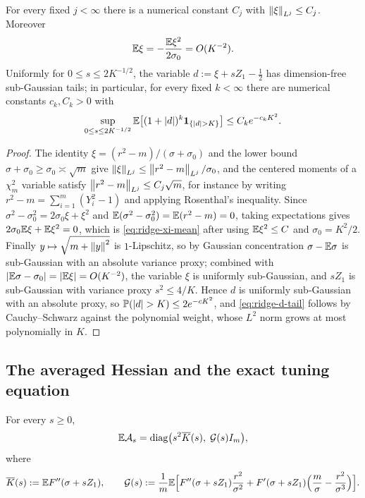 \begin{lemma}
\label{lem:ridge-xi}
For every fixed $j<\infty$ there is a numerical constant $C_j$ with
$\left\lVert \xi\right\rVert_{L^j}\leq C_j$. Moreover
\begin{equation}
\label{eq:ridge-xi-mean}
    \mathbb{E}\xi=-\frac{\mathbb{E}\xi^2}{2\sigma_0}=O(K^{-2}).
\end{equation}
Uniformly for $0\leq s\leq2K^{-1/2}$, the variable $d:=\xi+sZ_1-\tfrac12$ has dimension-free
sub-Gaussian tails; in particular, for every fixed $k<\infty$ there are numerical constants
$c_k,C_k>0$ with
\begin{equation}
\label{eq:ridge-d-tail}
    \sup_{0\leq s\leq2K^{-1/2}}
    \mathbb{E}\bigl[(1+\left\lvert d\right\rvert)^k\mathbf 1_{\{\left\lvert d\right\rvert>K\}}\bigr]\leq C_ke^{-c_kK^2}.
\end{equation}
\end{lemma}

\begin{proof}
The identity $\xi=(r^2-m)/(\sigma+\sigma_0)$ and the lower bound
$\sigma+\sigma_0\geq\sigma_0\asymp\sqrt m$ give
$\left\lVert \xi\right\rVert_{L^j}\leq\left\lVert r^2-m\right\rVert_{L^j}/\sigma_0$, and the centered moments of a $\chi_m^2$
variable satisfy $\left\lVert r^2-m\right\rVert_{L^j}\leq C_j\sqrt m$, for instance by writing
$r^2-m=\sum_{i=1}^m(Y_i^2-1)$ and applying Rosenthal's inequality. Since
$\sigma^2-\sigma_0^2=2\sigma_0\xi+\xi^2$ and $\mathbb{E}(\sigma^2-\sigma_0^2)=\mathbb{E}(r^2-m)=0$, taking
expectations gives $2\sigma_0\mathbb{E}\xi+\mathbb{E}\xi^2=0$, which is \eqref{eq:ridge-xi-mean} after using
$\mathbb{E}\xi^2\leq C$ and $\sigma_0=K^2/2$. Finally $y\mapsto\sqrt{m+\left\lVert y\right\rVert^2}$ is $1$-Lipschitz, so
by Gaussian concentration $\sigma-\mathbb{E}\sigma$ is sub-Gaussian with an absolute variance proxy;
combined with $\left\lvert \mathbb{E}\sigma-\sigma_0\right\rvert=\left\lvert \mathbb{E}\xi\right\rvert=O(K^{-2})$, the variable $\xi$ is uniformly
sub-Gaussian, and $sZ_1$ is sub-Gaussian with variance proxy $s^2\leq4/K$. Hence $d$ is
uniformly sub-Gaussian with an absolute proxy, so $\mathbb{P}(\left\lvert d\right\rvert>K)\leq2e^{-cK^2}$, and
\eqref{eq:ridge-d-tail} follows by Cauchy--Schwarz against the polynomial weight, whose $L^2$
norm grows at most polynomially in $K$.
\end{proof}

\subsection{The averaged Hessian and the exact tuning equation}

\begin{lemma}
\label{lem:ridge-mean-As}
For every $s\geq0$,
\begin{equation}
\label{eq:ridge-mean-As}
    \mathbb{E}\mathcal A_s=\operatorname{diag}\bigl(s^2\overline K(s),\;\mathcal G(s)I_m\bigr),
\end{equation}
where
\[
    \overline K(s):=\mathbb{E} F''(\sigma+sZ_1),
    \qquad
    \mathcal G(s):=\frac1m\mathbb{E}\Bigl[F''(\sigma+sZ_1)\frac{r^2}{\sigma^2}
    +F'(\sigma+sZ_1)\Bigl(\frac m\sigma-\frac{r^2}{\sigma^3}\Bigr)\Bigr].
\]
\end{lemma}

